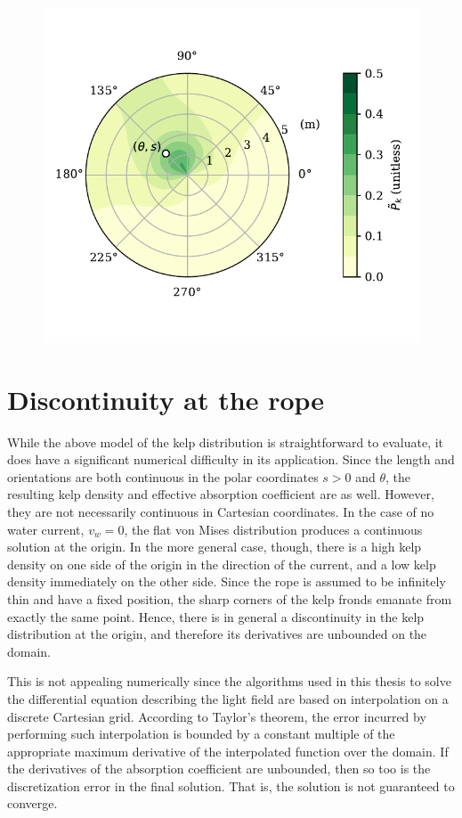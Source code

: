 \documentclass[ms,cpyr,lof,lot]{uathesis}
\begin{document}
\begin{figure}[h]
	\centering
	\includegraphics[width=4.5in]{prob_shade}
	\label{fig:prob_shade}
\end{figure}

\section{Discontinuity at the rope}
While the above model of the kelp distribution is straightforward to evaluate, it does have a significant numerical difficulty in its application.
Since the length and orientations are both continuous in the polar coordinates $s>0$ and $\theta$, the resulting kelp density and effective absorption coefficient are as well.
However, they are not necessarily continuous in Cartesian coordinates.
In the case of no water current, $v_w=0$, the flat von Mises distribution produces a continuous solution at the origin.
In the more general case, though, there is a high kelp density on one side of the origin in the direction of the current, and a low kelp density immediately on the other side.
Since the rope is assumed to be infinitely thin and have a fixed position, the sharp corners of the kelp fronds emanate from exactly the same point.
Hence, there is in general a discontinuity in the kelp distribution at the origin, and therefore its derivatives are unbounded on the domain.

This is not appealing numerically since the algorithms used in this thesis to solve the differential equation describing the light field are based on interpolation on a discrete Cartesian grid.
According to Taylor's theorem, the error incurred by performing such interpolation is bounded by a constant multiple of the appropriate maximum derivative of the interpolated function over the domain.
If the derivatives of the absorption coefficient are unbounded, then so too is the discretization error in the final solution.
That is, the solution is not guaranteed to converge.
\end{document}
